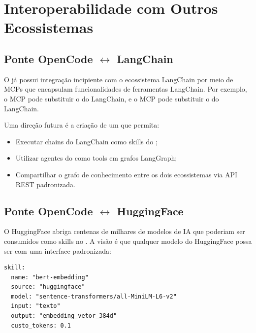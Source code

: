 \section{Interoperabilidade com Outros Ecossistemas}
\label{sec:interoperabilidade}
\nivelavancado

\subsection{Ponte OpenCode $\leftrightarrow$ LangChain}

O \opencodeeco{} já possui integração incipiente com o ecossistema
LangChain por meio de MCPs que encapsulam funcionalidades de
ferramentas LangChain. Por exemplo, o MCP  pode
substituir o  do LangChain, e o MCP
 pode substituir o  do LangChain.

Uma direção futura é a criação de um 
que permita:

\begin{itemize}
    \item Executar chains do LangChain como skills do \opencodeeco{};
    \item Utilizar agentes do \opencodeeco{} como tools em grafos
    LangGraph;
    \item Compartilhar o grafo de conhecimento entre os dois
    ecossistemas via API REST padronizada.
\end{itemize}

\subsection{Ponte OpenCode $\leftrightarrow$ HuggingFace}

O HuggingFace abriga centenas de milhares de modelos de IA que
poderiam ser consumidos como skills no \opencodeeco{}. A visão é
que qualquer modelo do HuggingFace possa ser  com uma interface padronizada:

\begin{verbatim}
skill:
  name: "bert-embedding"
  source: "huggingface"
  model: "sentence-transformers/all-MiniLM-L6-v2"
  input: "texto"
  output: "embedding_vetor_384d"
  custo_tokens: 0.1
\end{verbatim}


